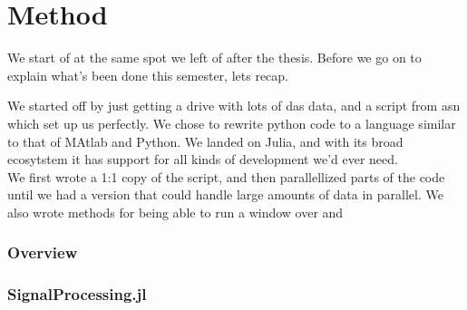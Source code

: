 \chapter{Method}
\label{chap:method}

We start of at the same spot we left of after the thesis. Before we go on to explain what's been done this semester, lets recap. 

We started off by just getting a drive with lots of \acrshort{das} data, and a script from \acrfull{asn} which set up us perfectly. We chose to rewrite python code to a language similar to that of MAtlab and Python. We landed on Julia, and with its broad ecosytstem it has support for all kinds of development we'd ever need. \\

We first wrote a 1:1 copy of the script, and then parallellized parts of the code until we had a version that could handle large amounts of data in parallel. We also wrote methods for being able to run a window over and 


\subsection{Overview}

\subsection{SignalProcessing.jl}